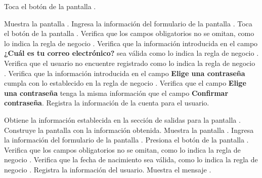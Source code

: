 \begin{UCtrayectoria}
    \UCpaso[\UCactor] Toca el botón  de la pantalla .
    
    \UCpaso[\UCsist]  Muestra la pantalla .
    \UCpaso[\UCactor] Ingresa la información del formulario de la pantalla . \label{cua12:tb} 
    \UCpaso[\UCactor] Toca el botón  de la pantalla . 
    \UCpaso[\UCsist] Verifica que los campos obligatorios no se omitan, como lo indica la regla de negocio . 
    \UCpaso[\UCsist] Verifica que la información introducida en el campo \textbf{¿Cuál es tu correo electrónico?} sea válida como lo indica la regla de negocio . 
    \UCpaso[\UCsist] Verifica que el usuario no encuentre registrado como lo indica la regla de negocio . 
    \UCpaso[\UCsist] Verifica que la información introducida en el campo \textbf{Elige una contraseña} cumpla con lo establecido en la regla de negocio . 
    \UCpaso[\UCsist] Verifica que el campo \textbf{Elige una contraseña} tenga la misma información que el campo \textbf{Confirmar contraseña}. 
    \UCpaso[\UCsist] Registra la información de la cuenta para el usuario.
    
    
    \UCpaso[\UCsist]  Obtiene la información establecida en la sección de salidas para la pantalla .
    \UCpaso[\UCsist]  Construye la pantalla  con la información obtenida.
    \UCpaso[\UCsist]  Muestra la pantalla .
    \UCpaso[\UCactor] Ingresa la información del formulario de la pantalla . \label{cua12:tc}
    \UCpaso[\UCactor] Presiona el botón  de la pantalla . 
    \UCpaso[\UCsist] Verifica que los campos obligatorios no se omitan, como lo indica la regla de negocio . 
    \UCpaso[\UCsist] Verifica que la fecha de nacimiento sea válida, como lo indica la regla de negocio . 
    \UCpaso[\UCsist] Registra la información del usuario.
    \UCpaso[\UCsist] Muestra el mensaje . \label{cua12:pe} 
 \end{UCtrayectoria}



